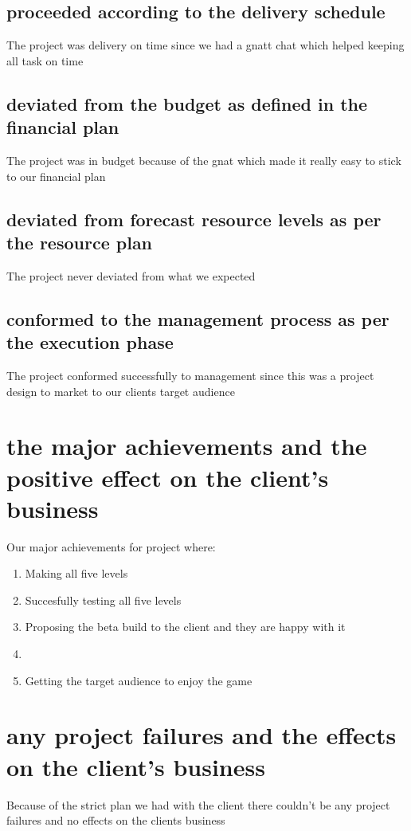 \documentclass{article}
\begin{document}
	\subsection{proceeded according to the delivery schedule}
	The project was delivery on time since we had a gnatt chat which helped keeping all task on time

	\subsection{deviated from the budget as defined in the financial plan}
	The project was in budget because of the gnat which made it really easy to stick to our financial plan

	\subsection{deviated from forecast resource levels as per the resource plan}
	The project never deviated from what we expected

	\subsection{conformed to the management process as per the execution phase}
	The project conformed successfully to management since this was a project design to market to our clients target audience 

\section{the major achievements and the positive effect on the client’s business}

Our major achievements for project where:
\begin{enumerate}
	\item Making all five levels
	\item Succesfully testing all five levels
	\item Proposing the beta build to the client and they are happy with it
	\item 
	\item Getting the target audience to enjoy the game
\end{enumerate}
\section{any project failures and the effects on the client’s business}
Because of the strict plan we had with the client there couldn't be any project failures and no effects on the clients business
\end{document}
